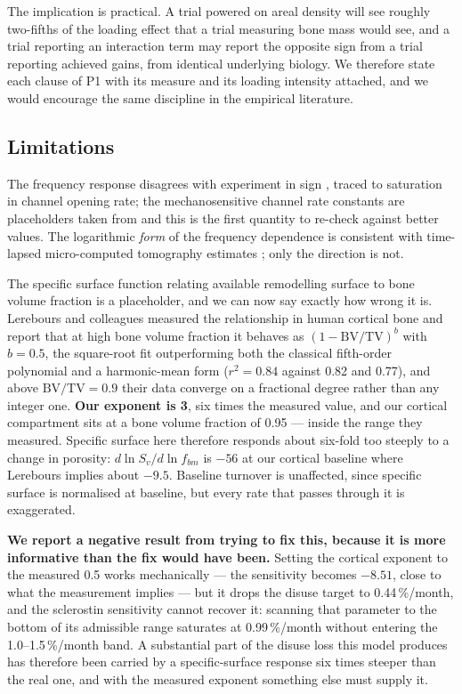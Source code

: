 \documentclass[10pt,letterpaper]{article}
\begin{document}
The implication is practical. A trial powered on areal density will see
roughly two-fifths of the loading effect that a trial measuring bone mass
would see, and a trial reporting an interaction term may report the opposite
sign from a trial reporting achieved gains, from identical underlying biology.
We therefore state each clause of P1 with its measure and its loading
intensity attached, and we would encourage the same discipline in the
empirical literature.

\subsection*{Limitations}

The frequency response disagrees with experiment in sign \cite{hsieh2001},
traced to saturation in channel opening rate; the mechanosensitive channel
rate constants are placeholders taken from \cite{fu2025} and this is the first
quantity to re-check against better values. The logarithmic \emph{form} of the
frequency dependence is consistent with time-lapsed micro-computed tomography
estimates \cite{marques2023}; only the direction is not.

The specific surface function relating available remodelling surface to bone
volume fraction is a placeholder, and we can now say exactly how wrong it is.
Lerebours and colleagues \cite{lerebours2015} measured the relationship in human
cortical bone and report that at high bone volume fraction it behaves as
$(1-\mathrm{BV/TV})^{b}$ with $b = 0.5$, the square-root fit outperforming both
the classical fifth-order polynomial and a harmonic-mean form ($r^2 = 0.84$
against 0.82 and 0.77), and above $\mathrm{BV/TV} = 0.9$ their data converge on a
fractional degree rather than any integer one. \textbf{Our exponent is 3}, six
times the measured value, and our cortical compartment sits at a bone volume
fraction of 0.95 --- inside the range they measured. Specific surface here
therefore responds about six-fold too steeply to a change in porosity:
$d\ln S_v/d\ln f_{bm}$ is $-56$ at our cortical baseline where Lerebours implies
about $-9.5$. Baseline turnover is unaffected, since specific surface is
normalised at baseline, but every rate that passes through it is exaggerated.

\textbf{We report a negative result from trying to fix this, because it is more
informative than the fix would have been.} Setting the cortical exponent to the
measured 0.5 works mechanically --- the sensitivity becomes $-8.51$, close to
what the measurement implies --- but it drops the disuse target to
0.44\,\%/month, and the sclerostin sensitivity cannot recover it: scanning that
parameter to the bottom of its admissible range saturates at 0.99\,\%/month
without entering the 1.0--1.5\,\%/month band. A substantial part of the disuse
loss this model produces has therefore been carried by a specific-surface
response six times steeper than the real one, and with the measured exponent
something else must supply it.
\end{document}
